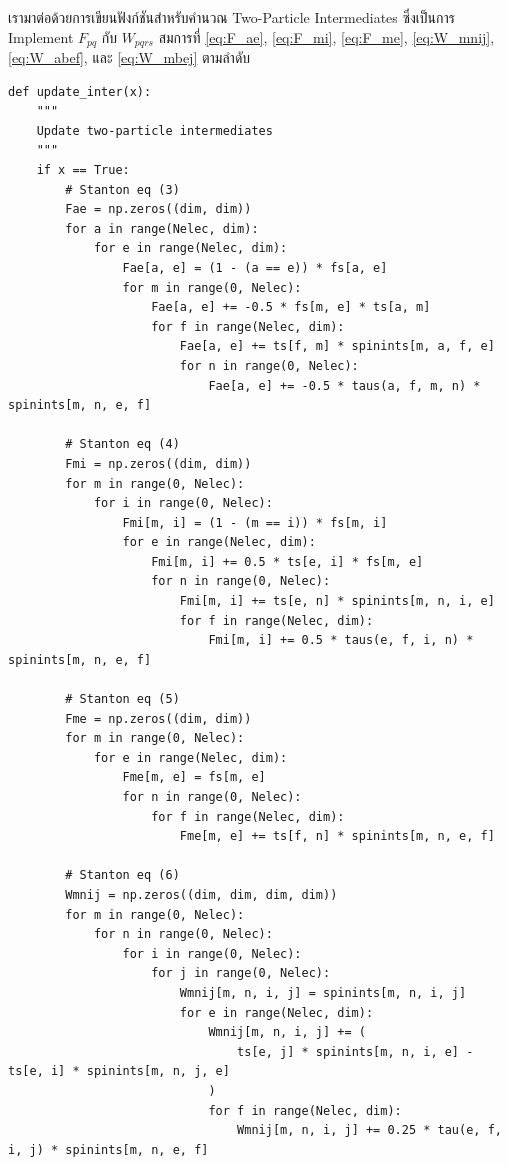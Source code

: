 \noindent เรามาต่อด้วยการเขียนฟังก์ชันสำหรับคำนวณ Two-Particle Intermediates ซึ่งเป็นการ Implement $F_{p q}$
กับ $W_{p q r s}$ สมการที่ \eqref{eq:F_ae}, \eqref{eq:F_mi}, \eqref{eq:F_me}, \eqref{eq:W_mnij},
\eqref{eq:W_abef}, และ \eqref{eq:W_mbej} ตามลำดับ

\vspace{5pt}

\begin{lstlisting}[style=MyPython]
def update_inter(x):
    """
    Update two-particle intermediates
    """
    if x == True:
        # Stanton eq (3)
        Fae = np.zeros((dim, dim))
        for a in range(Nelec, dim):
            for e in range(Nelec, dim):
                Fae[a, e] = (1 - (a == e)) * fs[a, e]
                for m in range(0, Nelec):
                    Fae[a, e] += -0.5 * fs[m, e] * ts[a, m]
                    for f in range(Nelec, dim):
                        Fae[a, e] += ts[f, m] * spinints[m, a, f, e]
                        for n in range(0, Nelec):
                            Fae[a, e] += -0.5 * taus(a, f, m, n) * spinints[m, n, e, f]

        # Stanton eq (4)
        Fmi = np.zeros((dim, dim))
        for m in range(0, Nelec):
            for i in range(0, Nelec):
                Fmi[m, i] = (1 - (m == i)) * fs[m, i]
                for e in range(Nelec, dim):
                    Fmi[m, i] += 0.5 * ts[e, i] * fs[m, e]
                    for n in range(0, Nelec):
                        Fmi[m, i] += ts[e, n] * spinints[m, n, i, e]
                        for f in range(Nelec, dim):
                            Fmi[m, i] += 0.5 * taus(e, f, i, n) * spinints[m, n, e, f]

        # Stanton eq (5)
        Fme = np.zeros((dim, dim))
        for m in range(0, Nelec):
            for e in range(Nelec, dim):
                Fme[m, e] = fs[m, e]
                for n in range(0, Nelec):
                    for f in range(Nelec, dim):
                        Fme[m, e] += ts[f, n] * spinints[m, n, e, f]

        # Stanton eq (6)
        Wmnij = np.zeros((dim, dim, dim, dim))
        for m in range(0, Nelec):
            for n in range(0, Nelec):
                for i in range(0, Nelec):
                    for j in range(0, Nelec):
                        Wmnij[m, n, i, j] = spinints[m, n, i, j]
                        for e in range(Nelec, dim):
                            Wmnij[m, n, i, j] += (
                                ts[e, j] * spinints[m, n, i, e] - ts[e, i] * spinints[m, n, j, e]
                            )
                            for f in range(Nelec, dim):
                                Wmnij[m, n, i, j] += 0.25 * tau(e, f, i, j) * spinints[m, n, e, f]


\end{lstlisting}
